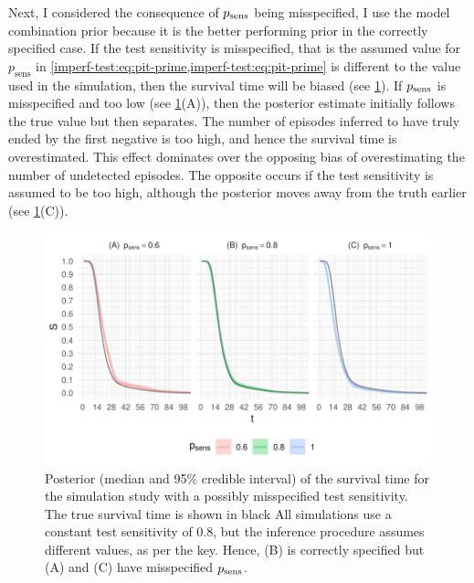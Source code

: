 \documentclass[thesis.tex]{subfiles}
\begin{document}
Next, I considered the consequence of $p_\text{sens}$ being misspecified, I use the model combination prior because it is the better performing prior in the correctly specified case.
If the test sensitivity is misspecified, that is the assumed value for $p_\text{sens}$ in \cref{imperf-test:eq:pit-prime,imperf-test:eq:pit-prime} is different to the value used in the simulation, then the survival time will be biased (see \cref{imperf-test:fig:misspecified-test-sensitivity}).
If $p_\text{sens}$ is misspecified and too low (see \cref{imperf-test:fig:misspecified-test-sensitivity}(A)), then the posterior estimate initially follows the true value but then separates.
The number of episodes inferred to have truly ended by the first negative is too high, and hence the survival time is overestimated.
This effect dominates over the opposing bias of overestimating the number of undetected episodes.
The opposite occurs if the test sensitivity is assumed to be too high, although the posterior moves away from the truth earlier (see \cref{imperf-test:fig:misspecified-test-sensitivity}(C)).
\begin{figure}
    \includegraphics[width=\textwidth]{cis-imperfect-testing/sim-misspecified-sensitivity}
  \caption[Simulation study results with misspecified test sensitivity]{%
    Posterior (median and 95\% credible interval) of the survival time for the simulation study with a possibly misspecified test sensitivity.
    The true survival time is shown in black
    All simulations use a constant test sensitivity of 0.8, but the inference procedure assumes different values, as per the key.
    Hence, (B) is correctly specified but (A) and (C) have misspecified $p_\text{sens}$.
  }
  \label{imperf-test:fig:misspecified-test-sensitivity}
\end{figure}
\end{document}

